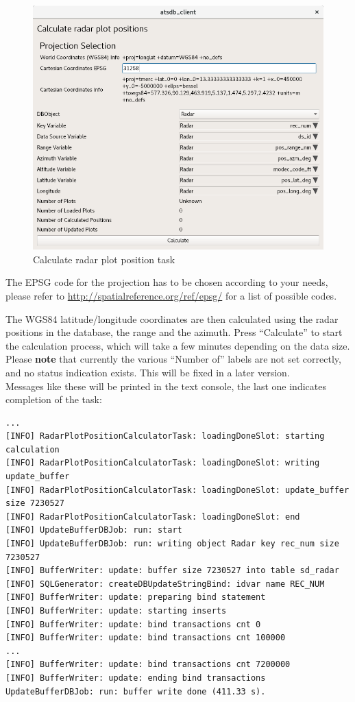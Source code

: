 \documentclass[10pt,letterpaper,extrafontsizes]{memoir}
\begin{document}
\begin{figure}[H]
  \center
    \includegraphics[width=14cm]{../screenshots/task_calc_radar.png}
  \caption{Calculate radar plot position task}
  \label{fig:task_calc_radar}
\end{figure}

The EPSG code for the projection has to be chosen according to your needs, please refer to \url{http://spatialreference.org/ref/epsg/} for a list of possible codes.

The WGS84 latitude/longitude coordinates are then calculated using the radar positions in the database, the range and the azimuth. Press ``Calculate'' to start the calculation process, which will take a few minutes depending on the data size. \\

Please \textbf{note} that currently the various ``Number of'' labels are not set correctly, and no status indication exists. This will be fixed in a later version. \\

Messages like these will be printed in the text console, the last one indicates completion of the task:

\begin{verbatim}
...
[INFO] RadarPlotPositionCalculatorTask: loadingDoneSlot: starting calculation
[INFO] RadarPlotPositionCalculatorTask: loadingDoneSlot: writing update_buffer
[INFO] RadarPlotPositionCalculatorTask: loadingDoneSlot: update_buffer size 7230527
[INFO] RadarPlotPositionCalculatorTask: loadingDoneSlot: end
[INFO] UpdateBufferDBJob: run: start
[INFO] UpdateBufferDBJob: run: writing object Radar key rec_num size 7230527
[INFO] BufferWriter: update: buffer size 7230527 into table sd_radar
[INFO] SQLGenerator: createDBUpdateStringBind: idvar name REC_NUM
[INFO] BufferWriter: update: preparing bind statement
[INFO] BufferWriter: update: starting inserts
[INFO] BufferWriter: update: bind transactions cnt 0
[INFO] BufferWriter: update: bind transactions cnt 100000
...
[INFO] BufferWriter: update: bind transactions cnt 7200000
[INFO] BufferWriter: update: ending bind transactions
UpdateBufferDBJob: run: buffer write done (411.33 s).
\end{verbatim}
\end{document}

